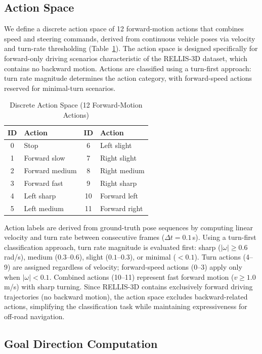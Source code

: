 \documentclass[sensors,article,submit,pdftex,moreauthors]{Definitions/mdpi}
\begin{document}
\subsection{Action Space}
\label{sec:action_space}

We define a discrete action space of 12 forward-motion actions that combines speed and steering commands, derived from continuous vehicle poses via velocity and turn-rate thresholding (Table~\ref{tab:action_space}). The action space is designed specifically for forward-only driving scenarios characteristic of the RELLIS-3D dataset, which contains no backward motion. Actions are classified using a turn-first approach: turn rate magnitude determines the action category, with forward-speed actions reserved for minimal-turn scenarios.

\begin{table}[h]
\caption{Discrete Action Space (12 Forward-Motion Actions)}
\label{tab:action_space}
\centering
\begin{tabular}{clcl}
\toprule
ID & Action & ID & Action \\
\midrule
0 & Stop & 6 & Left slight \\
1 & Forward slow & 7 & Right slight \\
2 & Forward medium & 8 & Right medium \\
3 & Forward fast & 9 & Right sharp \\
4 & Left sharp & 10 & Forward left \\
5 & Left medium & 11 & Forward right \\
\bottomrule
\end{tabular}
\end{table}

Action labels are derived from ground-truth pose sequences by computing linear velocity and turn rate between consecutive frames ($\Delta t = 0.1$\,s). Using a turn-first classification approach, turn rate magnitude is evaluated first: sharp ($|\omega| \geq 0.6$ rad/s), medium ($0.3$--$0.6$), slight ($0.1$--$0.3$), or minimal ($< 0.1$). Turn actions (4--9) are assigned regardless of velocity; forward-speed actions (0--3) apply only when $|\omega| < 0.1$. Combined actions (10--11) represent fast forward motion ($v \geq 1.0$ m/s) with sharp turning. Since RELLIS-3D contains exclusively forward driving trajectories (no backward motion), the action space excludes backward-related actions, simplifying the classification task while maintaining expressiveness for off-road navigation.

\subsection{Goal Direction Computation}
\label{sec:goal_direction}
\end{document}

